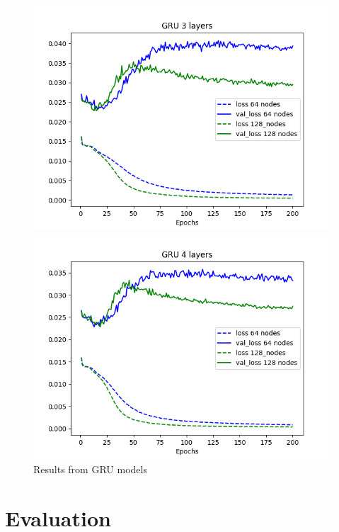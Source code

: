 \documentclass[11pt]
{article}
\begin{document}
\begin{figure}[H]
\begin{minipage}[b]{0.33\linewidth}
		\includegraphics[width=\linewidth]{../TESTS_RESULTS/GRU_tests/plots/3_comp.png} 
	\end{minipage}%
	\begin{minipage}[b]{0.33\linewidth}
		\centering
		\includegraphics[width=\linewidth]{../TESTS_RESULTS/GRU_tests/plots/4_comp.png} 
	\end{minipage} 
	\caption{Results from GRU models} 
\end{figure}

\section{Evaluation}
\end{document}
